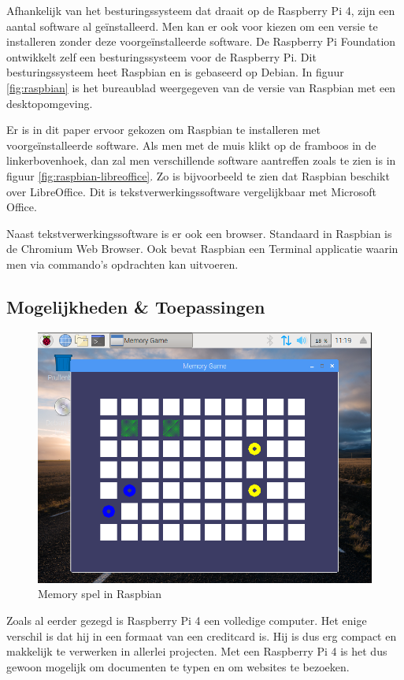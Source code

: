 \documentclass[a4paper, dutch, abstract=true]{scrartcl}
\begin{document}
Afhankelijk van het besturingssysteem dat draait op de Raspberry Pi 4, zijn een aantal software al
ge{\"i}nstalleerd.
Men kan er ook voor kiezen om een versie te installeren zonder deze voorge{\"i}nstalleerde software.
De Raspberry Pi Foundation ontwikkelt zelf een besturingssysteem voor de Raspberry Pi.
Dit besturingssysteem heet Raspbian en is gebaseerd op Debian.
In figuur \ref{fig:raspbian} is het bureaublad weergegeven van de versie van Raspbian met een
desktopomgeving.

Er is in dit paper ervoor gekozen om Raspbian te installeren met voorge{\"i}nstalleerde software.
Als men met de muis klikt op de framboos in de linkerbovenhoek, dan zal men verschillende software
aantreffen zoals te zien is in figuur \ref{fig:raspbian-libreoffice}.
Zo is bijvoorbeeld te zien dat Raspbian beschikt over LibreOffice.
Dit is tekstverwerkingssoftware vergelijkbaar met Microsoft Office.

Naast tekstverwerkingssoftware is er ook een browser.
Standaard in Raspbian is de Chromium Web Browser.
Ook bevat Raspbian een Terminal applicatie waarin men via commando's opdrachten kan uitvoeren.

\subsection{Mogelijkheden \& Toepassingen}
\begin{figure}[h]
    \centering
    \includegraphics[scale=0.25]{raspbian-memory.png}
    \caption{Memory spel in Raspbian}
    \label{fig:raspbian-memory}
\end{figure}
Zoals al eerder gezegd is Raspberry Pi 4 een volledige computer.
Het enige verschil is dat hij in een formaat van een creditcard is.
Hij is dus erg compact en makkelijk te verwerken in allerlei projecten.
Met een Raspberry Pi 4 is het dus gewoon mogelijk om documenten te typen en om websites te bezoeken.
\end{document}
